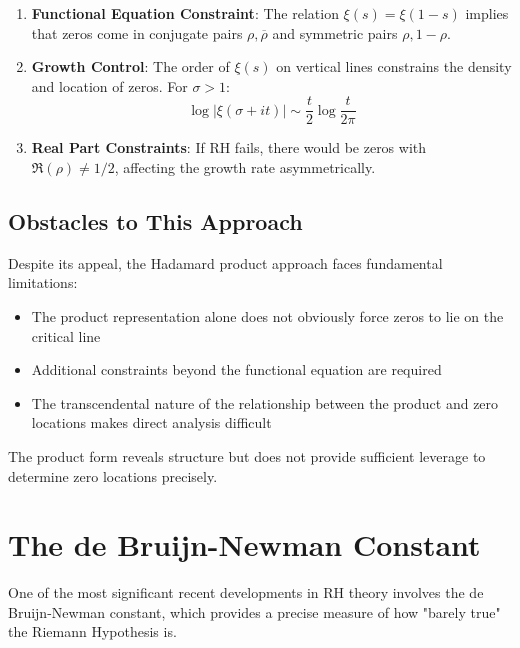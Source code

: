 \begin{enumerate}
\item \textbf{Functional Equation Constraint}: The relation $\xi(s) = \xi(1-s)$ implies that zeros come in conjugate pairs $\rho, \overline{\rho}$ and symmetric pairs $\rho, 1-\rho$.

\item \textbf{Growth Control}: The order of $\xi(s)$ on vertical lines constrains the density and location of zeros. For $\sigma > 1$:
\begin{equation}
\log|\xi(\sigma + it)| \sim \frac{t}{2}\log\frac{t}{2\pi}
\end{equation}

\item \textbf{Real Part Constraints}: If RH fails, there would be zeros with $\Re(\rho) \neq 1/2$, affecting the growth rate asymmetrically.
\end{enumerate}

\subsection{Obstacles to This Approach}

Despite its appeal, the Hadamard product approach faces fundamental limitations:

\begin{remark}
\begin{itemize}
\item The product representation alone does not obviously force zeros to lie on the critical line
\item Additional constraints beyond the functional equation are required
\item The transcendental nature of the relationship between the product and zero locations makes direct analysis difficult
\end{itemize}
\end{remark}

The product form reveals structure but does not provide sufficient leverage to determine zero locations precisely.

\section{The de Bruijn-Newman Constant}

One of the most significant recent developments in RH theory involves the de Bruijn-Newman constant, which provides a precise measure of how "barely true" the Riemann Hypothesis is.

